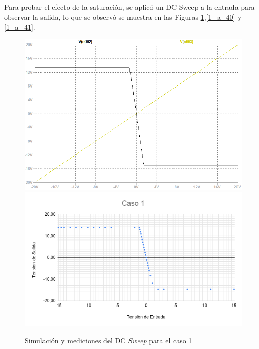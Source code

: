 Para probar el efecto de la saturación, se aplicó un DC Sweep a la
entrada para observar la salida, lo que se observó se muestra en las
Figuras \ref{1_a_39},\ref{1_a_40} y \ref{1_a_41}.

\begin{figure}[H]
\begin{centering}
\includegraphics[scale=0.4]{../Ex1/iA/Resources1a/dcswp1sim}\includegraphics[scale=0.4]{../Ex1/iA/Resources1a/DCSWEEP1MED}
\par\end{centering}
\caption{Simulación y mediciones del DC \emph{Sweep} para el caso 1}
\label{1_a_39}

\end{figure}

